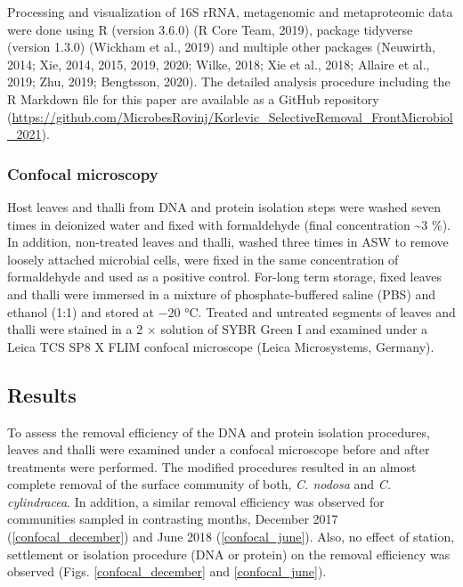 \documentclass[12pt,]{article}
\begin{document}
Processing and visualization of 16S rRNA, metagenomic and metaproteomic
data were done using R (version 3.6.0) (R Core Team, 2019), package
tidyverse (version 1.3.0) (Wickham et al., 2019) and multiple other
packages (Neuwirth, 2014; Xie, 2014, 2015, 2019, 2020; Wilke, 2018; Xie
et al., 2018; Allaire et al., 2019; Zhu, 2019; Bengtsson, 2020). The
detailed analysis procedure including the R Markdown file for this paper
are available as a GitHub repository
(\url{https://github.com/MicrobesRovinj/Korlevic_SelectiveRemoval_FrontMicrobiol_2021}).

\hypertarget{confocal-microscopy}{%
\subsubsection{Confocal microscopy}\label{confocal-microscopy}}

Host leaves and thalli from DNA and protein isolation steps were washed
seven times in deionized water and fixed with formaldehyde (final
concentration \textasciitilde{}3 \si{\percent}). In addition,
non-treated leaves and thalli, washed three times in ASW to remove
loosely attached microbial cells, were fixed in the same concentration
of formaldehyde and used as a positive control. For-long term storage,
fixed leaves and thalli were immersed in a mixture of phosphate-buffered
saline (PBS) and ethanol (1:1) and stored at \num{-20}
\si{\degreeCelsius}. Treated and untreated segments of leaves and thalli
were stained in a 2 × solution of SYBR Green I and examined under a
Leica TCS SP8 X FLIM confocal microscope (Leica Microsystems, Germany).

\newpage

\hypertarget{results}{%
\subsection{Results}\label{results}}

To assess the removal efficiency of the DNA and protein isolation
procedures, leaves and thalli were examined under a confocal microscope
before and after treatments were performed. The modified procedures
resulted in an almost complete removal of the surface community of both,
\emph{C. nodosa} and \emph{C. cylindracea}. In addition, a similar
removal efficiency was observed for communities sampled in contrasting
months, December 2017 (\autoref{confocal_december}) and June 2018
(\autoref{confocal_june}). Also, no effect of station, settlement or
isolation procedure (DNA or protein) on the removal efficiency was
observed (Figs. \ref{confocal_december} and \ref{confocal_june}).
\end{document}
